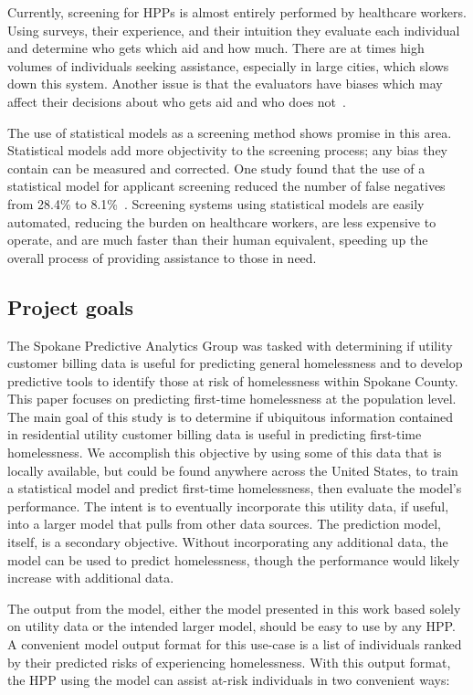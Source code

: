 \documentclass[10pt,letterpaper]{article}
\begin{document}
Currently, screening for HPPs is almost entirely performed by healthcare workers. Using surveys, their experience, and their intuition they evaluate each individual and determine who gets which aid and how much. There are at times high volumes of individuals seeking assistance, especially in large cities, which slows down this system. Another issue is that the evaluators have biases which may affect their decisions about who gets aid and who does not~\cite{shinn2019homelessness}.

The use of statistical models as a screening method shows promise in this area. Statistical models add more objectivity to the screening process; any bias they contain can be measured and corrected. One study found that the use of a statistical model for applicant screening reduced the number of false negatives from 28.4\% to 8.1\%~\cite{shinn2019homelessness}. Screening systems using statistical models are easily automated, reducing the burden on healthcare workers, are less expensive to operate, and are much faster than their human equivalent, speeding up the overall process of providing assistance to those in need.

\subsection*{Project goals}
The Spokane Predictive Analytics Group was tasked with determining if utility customer billing data is useful for predicting general homelessness and to develop predictive tools to identify those at risk of homelessness within Spokane County. This paper focuses on predicting first-time homelessness at the population level. The main goal of this study is to determine if ubiquitous information contained in residential utility customer billing data is useful in predicting first-time homelessness. We accomplish this objective by using some of this data that is locally available, but could be found anywhere across the United States, to train a statistical model and predict first-time homelessness, then evaluate the model's performance. The intent is to eventually incorporate this utility data, if useful, into a larger model that pulls from other data sources. The prediction model, itself, is a secondary objective. Without incorporating any additional data, the model can be used to predict homelessness, though the performance would likely increase with additional data.

The output from the model, either the model presented in this work based solely on utility data or the intended larger model, should be easy to use by any HPP. A convenient model output format for this use-case is a list of individuals ranked by their predicted risks of experiencing homelessness. With this output format, the HPP using the model can assist at-risk individuals in two convenient ways:
\end{document}
